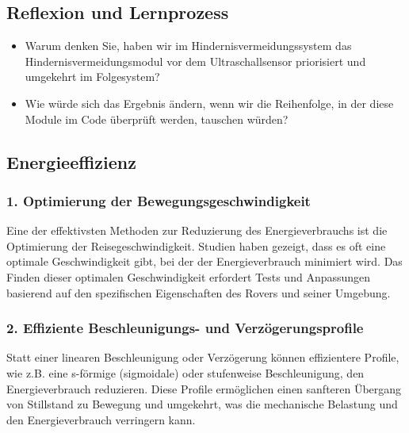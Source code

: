 \documentclass{vorlage-design-main}
\begin{document}
\hypertarget{reflexion-und-lernprozess}{%
\subsection{Reflexion und Lernprozess}\label{reflexion-und-lernprozess}}

\begin{itemize}
\item
  Warum denken Sie, haben wir im Hindernisvermeidungssystem das
  Hindernisvermeidungsmodul vor dem Ultraschallsensor priorisiert und
  umgekehrt im Folgesystem?
\item
  Wie würde sich das Ergebnis ändern, wenn wir die Reihenfolge, in der
  diese Module im Code überprüft werden, tauschen würden?
\end{itemize}

\hypertarget{energieeffizienz}{%
\subsection{Energieeffizienz}\label{energieeffizienz}}

\hypertarget{optimierung-der-bewegungsgeschwindigkeit}{%
\subsubsection{\texorpdfstring{1. \textbf{Optimierung der
Bewegungsgeschwindigkeit}}{1. Optimierung der Bewegungsgeschwindigkeit}}\label{optimierung-der-bewegungsgeschwindigkeit}}

Eine der effektivsten Methoden zur Reduzierung des Energieverbrauchs ist
die Optimierung der Reisegeschwindigkeit. Studien haben gezeigt, dass es
oft eine optimale Geschwindigkeit gibt, bei der der Energieverbrauch
minimiert wird. Das Finden dieser optimalen Geschwindigkeit erfordert
Tests und Anpassungen basierend auf den spezifischen Eigenschaften des
Rovers und seiner Umgebung.

\hypertarget{effiziente-beschleunigungs--und-verzuxf6gerungsprofile}{%
\subsubsection{\texorpdfstring{2. \textbf{Effiziente Beschleunigungs-
und
Verzögerungsprofile}}{2. Effiziente Beschleunigungs- und Verzögerungsprofile}}\label{effiziente-beschleunigungs--und-verzoegerungsprofile}}

Statt einer linearen Beschleunigung oder Verzögerung können effizientere
Profile, wie z.B. eine s-förmige (sigmoidale) oder stufenweise
Beschleunigung, den Energieverbrauch reduzieren. Diese Profile
ermöglichen einen sanfteren Übergang von Stillstand zu Bewegung und
umgekehrt, was die mechanische Belastung und den Energieverbrauch
verringern kann.
\end{document}
